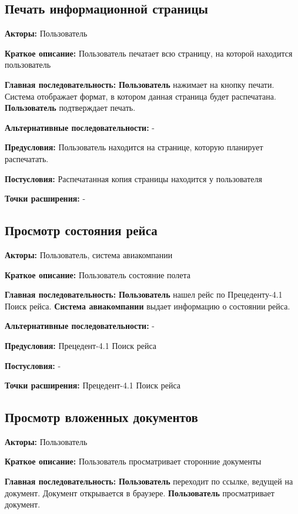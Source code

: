 \subsection{Печать информационной страницы}

\textbf{Акторы:} Пользователь

\textbf{Краткое описание:} Пользователь печатает всю страницу, на которой находится пользователь

\textbf{Главная последовательность:} \textbf{Пользователь} нажимает на кнопку печати. Система отображает формат, в котором данная страница
будет распечатана. \textbf{Пользователь} подтверждает печать.

\textbf{Альтернативные последовательности:} -

\textbf{Предусловия:} Пользователь находится на странице, которую планирует распечатать.

\textbf{Постусловия:} Распечатанная копия страницы находится у пользователя

\textbf{Точки расширения:} -




\subsection{Просмотр состояния рейса}

\textbf{Акторы:} Пользователь, система авиакомпании

\textbf{Краткое описание:} Пользователь состояние полета

\textbf{Главная последовательность:} \textbf{Пользователь} нашел рейс по Прецеденту-4.1 Поиск рейса. \textbf{Система авиакомпании}
выдает информацию о состоянии рейса.

\textbf{Альтернативные последовательности:} -

\textbf{Предусловия:} Прецедент-4.1 Поиск рейса

\textbf{Постусловия:} -

\textbf{Точки расширения:} Прецедент-4.1 Поиск рейса




\subsection{Просмотр вложенных документов}

\textbf{Акторы:} Пользователь

\textbf{Краткое описание:} Пользователь просматривает сторонние документы

\textbf{Главная последовательность:} \textbf{Пользователь} переходит по ссылке, ведущей на документ. Документ открывается в браузере.
\textbf{Пользователь} просматривает документ.

